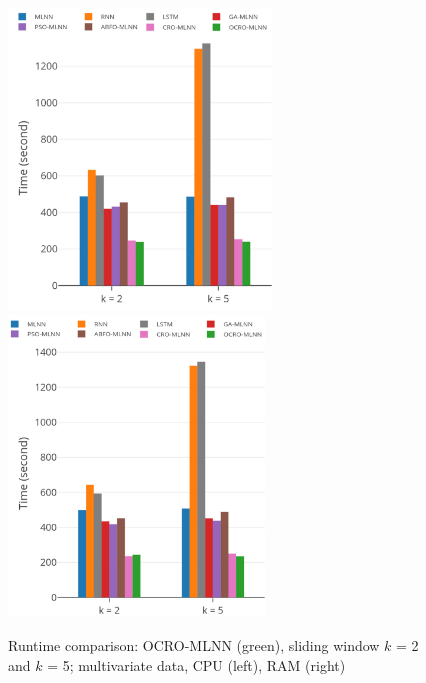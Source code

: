 \documentclass[smallcondensed, natbib]{svjour3}     %
\begin{document}
{\begin{figure}
	\centering
	\begin{minipage}[t]{1.0\textwidth}
		\centering
		\includegraphics[width=0.45\textwidth =0cm 0cm 0cm 0cm, height = 8cm]{time/time_cpu.pdf}
		\centering
		\includegraphics[width=0.45\textwidth =0cm 0cm 0cm 0cm, height = 8cm]{time/time_ram.pdf}
	\end{minipage}
	\caption{Runtime comparison: OCRO-MLNN (green), sliding window $k$ = 2 and $k$ = 5; multivariate data, CPU (left), RAM (right)} 
	\label{fig:speed_system_multivariate}
\end{figure}

}
\end{document}
